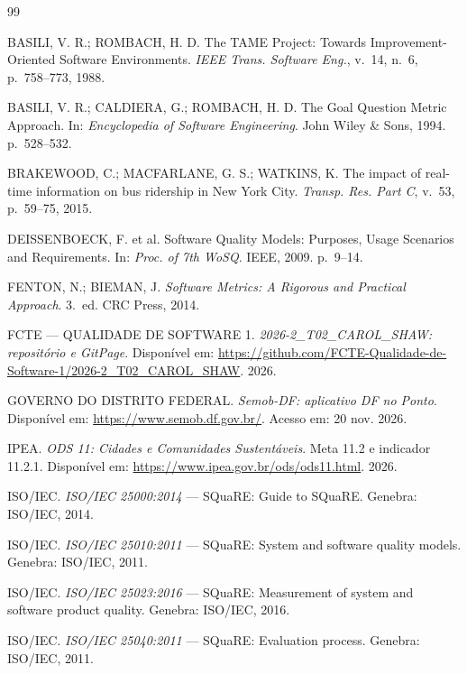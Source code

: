 \documentclass[11pt,a4paper]{article}
\begin{document}
\begin{thebibliography}{99}
\scriptsize
\setlength{\itemsep}{-1pt}
\setlength{\parskip}{0pt}

BASILI, V. R.; ROMBACH, H. D. The TAME Project: Towards Improvement-Oriented Software Environments. \emph{IEEE Trans. Software Eng.}, v.~14, n.~6, p.~758--773, 1988.

BASILI, V. R.; CALDIERA, G.; ROMBACH, H. D. The Goal Question Metric Approach. In: \emph{Encyclopedia of Software Engineering}. John Wiley \& Sons, 1994. p.~528--532.

BRAKEWOOD, C.; MACFARLANE, G. S.; WATKINS, K. The impact of real-time information on bus ridership in New York City. \emph{Transp. Res. Part C}, v.~53, p.~59--75, 2015.

DEISSENBOECK, F. et al. Software Quality Models: Purposes, Usage Scenarios and Requirements. In: \emph{Proc. of 7th WoSQ}. IEEE, 2009. p.~9--14.

FENTON, N.; BIEMAN, J. \emph{Software Metrics: A Rigorous and Practical Approach}. 3.~ed. CRC Press, 2014.

FCTE --- QUALIDADE DE SOFTWARE 1. \emph{2026-2\_T02\_CAROL\_SHAW: repositório e GitPage}. Disponível em: \url{https://github.com/FCTE-Qualidade-de-Software-1/2026-2_T02_CAROL_SHAW}. 2026.

GOVERNO DO DISTRITO FEDERAL. \emph{Semob-DF: aplicativo DF no Ponto}. Disponível em: \url{https://www.semob.df.gov.br/}. Acesso em: 20 nov. 2026.

IPEA. \emph{ODS 11: Cidades e Comunidades Sustentáveis}. Meta 11.2 e indicador 11.2.1. Disponível em: \url{https://www.ipea.gov.br/ods/ods11.html}. 2026.

ISO/IEC. \emph{ISO/IEC 25000:2014} --- SQuaRE: Guide to SQuaRE. Genebra: ISO/IEC, 2014.

ISO/IEC. \emph{ISO/IEC 25010:2011} --- SQuaRE: System and software quality models. Genebra: ISO/IEC, 2011.

ISO/IEC. \emph{ISO/IEC 25023:2016} --- SQuaRE: Measurement of system and software product quality. Genebra: ISO/IEC, 2016.

ISO/IEC. \emph{ISO/IEC 25040:2011} --- SQuaRE: Evaluation process. Genebra: ISO/IEC, 2011.


\end{thebibliography}
\end{document}
